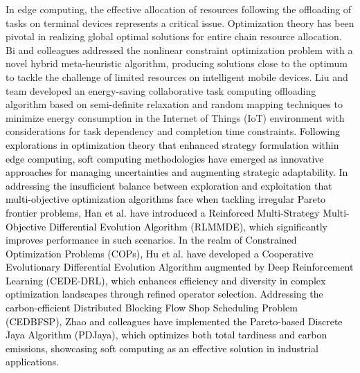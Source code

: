 \documentclass[preprint,12pt]{elsarticle}
\begin{document}
In edge computing, the effective allocation of resources following the offloading of tasks on terminal devices represents a critical issue. Optimization theory has been pivotal in realizing global optimal solutions for entire chain resource allocation. Bi and colleagues addressed the nonlinear constraint optimization problem with a novel hybrid meta-heuristic algorithm, producing solutions close to the optimum to tackle the challenge of limited resources on intelligent mobile devices\cite{bi2020energy}. Liu and team developed an energy-saving collaborative task computing offloading algorithm based on semi-definite relaxation and random mapping techniques to minimize energy consumption in the Internet of Things (IoT) environment with considerations for task dependency and completion time constraints\cite{liu2019energy}. 
\textcolor{black}{Following explorations in optimization theory that enhanced strategy formulation within edge computing, soft computing methodologies have emerged as innovative approaches for managing uncertainties and augmenting strategic adaptability. In addressing the insufficient balance between exploration and exploitation that multi-objective optimization algorithms face when tackling irregular Pareto frontier problems, Han et al. have introduced a Reinforced Multi-Strategy Multi-Objective Differential Evolution Algorithm (RLMMDE), which significantly improves performance in such scenarios\cite{han2023multi}. In the realm of Constrained Optimization Problems (COPs), Hu et al. have developed a Cooperative Evolutionary Differential Evolution Algorithm augmented by Deep Reinforcement Learning (CEDE-DRL), which enhances efficiency and diversity in complex optimization landscapes through refined operator selection\cite{hu2023deep}. Addressing the carbon-efficient Distributed Blocking Flow Shop Scheduling Problem (CEDBFSP), Zhao and colleagues have implemented the Pareto-based Discrete Jaya Algorithm (PDJaya), which optimizes both total tardiness and carbon emissions, showcasing soft computing as an effective solution in industrial applications\cite{zhao2022pareto}.}
\end{document}
